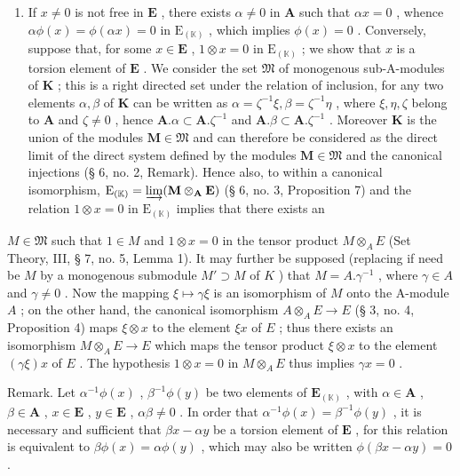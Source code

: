 \begin{enumerate}
\def\labelenumi{(\roman{enumi})}
\setcounter{enumi}{1}
\tightlist
\item
  If \(x \neq 0\) is not free in \(\mathbf{E}\) , there exists \(\alpha \neq 0\) in \(\mathbf{A}\) such that \(\alpha x = 0\) , whence \(\alpha \phi(x) = \phi(\alpha x) = 0\) in \(\mathrm{E}_{(\mathbb{K})}\) , which implies \(\phi(x) = 0\) . Conversely, suppose that, for some \(x \in \mathbf{E}\) , \(1 \otimes x = 0\) in \(\mathrm{E}_{(\mathbb{K})}\) ; we show that \(x\) is a torsion element of \(\mathbf{E}\) . We consider the set \(\mathfrak{M}\) of monogenous sub-A-modules of \(\mathbf{K}\) ; this is a right directed set under the relation of inclusion, for any two elements \(\alpha, \beta\) of \(\mathbf{K}\) can be written as \(\alpha = \zeta^{-1}\xi, \beta = \zeta^{-1}\eta\) , where \(\xi, \eta, \zeta\) belong to \(\mathbf{A}\) and \(\zeta \neq 0\) , hence \(\mathbf{A}. \alpha \subset \mathbf{A}. \zeta^{-1}\) and \(\mathbf{A}. \beta \subset \mathbf{A}. \zeta^{-1}\) . Moreover \(\mathbf{K}\) is the union of the modules \(\mathbf{M} \in \mathfrak{M}\) and can therefore be considered as the direct limit of the direct system defined by the modules \(\mathbf{M} \in \mathfrak{M}\) and the canonical injections (§ 6, no. 2, Remark). Hence also, to within a canonical isomorphism, \(\mathrm{E}_{(\mathbb{K})} = \varinjlim (\mathbf{M} \otimes_{\mathbf{A}} \mathbf{E})\) (§ 6, no. 3, Proposition 7) and the relation \(1 \otimes x = 0\) in \(\mathrm{E}_{(\mathbb{K})}\) implies that there exists an
\end{enumerate}

\(M \in \mathfrak{M}\) such that \(1 \in M\) and \(1 \otimes x = 0\) in the tensor product \(M \otimes_{A} E\) (Set Theory, III, § 7, no. 5, Lemma 1). It may further be supposed (replacing if need be \(M\) by a monogenous submodule \(M' \supset M\) of \(K\) ) that \(M = A. \gamma^{-1}\) , where \(\gamma \in A\) and \(\gamma \neq 0\) . Now the mapping \(\xi \mapsto \gamma\xi\) is an isomorphism of \(M\) onto the A-module \(A\) ; on the other hand, the canonical isomorphism \(A \otimes_{A} E \to E\) (§ 3, no. 4, Proposition 4) maps \(\xi \otimes x\) to the element \(\xi x\) of \(E\) ; thus there exists an isomorphism \(M \otimes_{A} E \to E\) which maps the tensor product \(\xi \otimes x\) to the element \((\gamma\xi)x\) of \(E\) . The hypothesis \(1 \otimes x = 0\) in \(M \otimes_{A} E\) thus implies \(\gamma x = 0\) .

Remark. Let \(\alpha^{-1}\phi(x)\) , \(\beta^{-1}\phi(y)\) be two elements of \(\mathbf{E}_{(\mathbb{K})}\) , with \(\alpha\in\mathbf{A}\) , \(\beta\in\mathbf{A}\) , \(x\in\mathbf{E}\) , \(y\in\mathbf{E}\) , \(\alpha\beta\neq0\) . In order that \(\alpha^{-1}\phi(x)=\beta^{-1}\phi(y)\) , it is necessary and sufficient that \(\beta x-\alpha y\) be a torsion element of \(\mathbf{E}\) , for this relation is equivalent to \(\beta\phi(x)=\alpha\phi(y)\) , which may also be written \(\phi(\beta x-\alpha y)=0\) .

